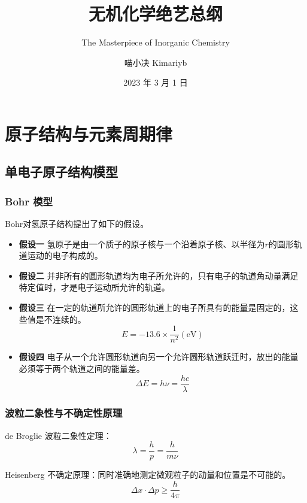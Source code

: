 \documentclass[
  10pt,
  twoside,
  openany,
  b5paper, %
  colorscheme = basic, %
]{qyxf-book}
\title{无机化学绝艺总纲}
\subtitle{The Masterpiece of Inorganic Chemistry}  %
\author{喵小决 Kimariyb}
\date{2023 年 3 月 1 日}
\begin{document}
\maketitle

\tableofcontents

\chapter{原子结构与元素周期律}

\section{单电子原子结构模型}

\subsection{Bohr 模型}

Bohr对氢原子结构提出了如下的假设。
\begin{itemize}
	\item \textbf{假设一} \quad 氢原子是由一个质子的原子核与一个沿着原子核、以半径为$r$的圆形轨道运动的电子构成的。
	\item \textbf{假设二} \quad 并非所有的圆形轨道均为电子所允许的，只有电子的轨道角动量满足特定值时，才是电子运动所允许的轨道。
	\item \textbf{假设三} \quad 在一定的轨道所允许的圆形轨道上的电子所具有的能量是固定的，这些值是不连续的。
	\begin{equation*}
		E = -13.6 \times \frac{1}{n^2}(\mathrm{eV})
	\end{equation*}
	\item \textbf{假设四} \quad 电子从一个允许圆形轨道向另一个允许圆形轨道跃迁时，放出的能量必须等于两个轨道之间的能量差。
	\begin{equation*}
		\Delta E = h\nu = \frac{hc}{\lambda}
	\end{equation*}
\end{itemize}

\subsection{波粒二象性与不确定性原理}

de Broglie 波粒二象性定理：
\begin{equation*}
	\lambda = \frac{h}{p} = \frac{h}{m\nu}
\end{equation*}

Heisenberg 不确定原理：同时准确地测定微观粒子的动量和位置是不可能的。
\begin{equation*}
	\Delta x \cdot \Delta p \geqslant \frac{h}{4\pi}
\end{equation*}
\end{document}
